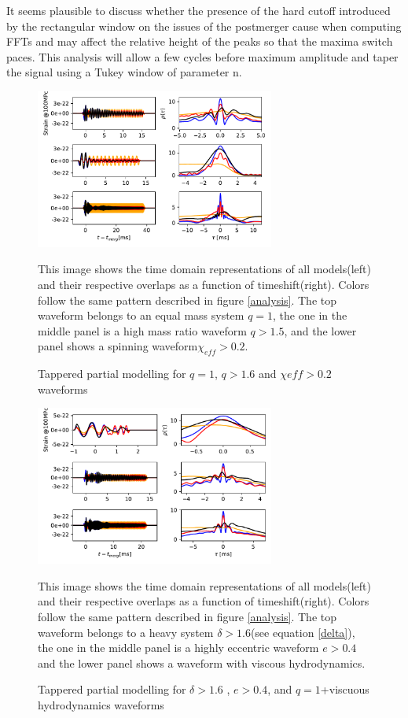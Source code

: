 It seems plausible to discuss whether the presence of the hard cutoff introduced by the rectangular window on the issues of the postmerger cause when computing FFTs and may affect the relative height of the peaks so that the maxima switch paces. This analysis will allow a few cycles before maximum amplitude and taper the signal using a Tukey window of parameter n.

\begin{figure}[hbt!]
\begin{center}
\includegraphics[width=0.7\textwidth, angle=0]{images/Data_analysis/results/phi-A3.pdf}
\caption{Tappered partial modelling for $q=1$, $q>1.6$ and $\chi{eff}>0.2$ waveforms}
\end{center}
This image shows the time domain representations of all models(left) and their respective overlaps as a function of timeshift(right). Colors follow the same pattern described in figure \ref{analysis}. The top waveform belongs to an equal mass system $q=1$, the one in the middle panel is a high mass ratio waveform $q>1.5$, and the lower panel shows a spinning waveform$\chi_{eff}>0.2$.
\end{figure}

\begin{figure}[hbt!]
\begin{center}
\includegraphics[width=0.7\textwidth, angle=0]{images/Data_analysis/results/phi-A4.pdf}
\caption{Tappered partial modelling for $\delta>1.6$ , $e>0.4$, and $q=1$+viscuous hydrodynamics waveforms}
\end{center}
This image shows the time domain representations of all models(left) and their respective overlaps as a function of timeshift(right). Colors follow the same pattern described in figure \ref{analysis}. The top waveform belongs to a heavy system $\delta>1.6$(see equation \ref{delta}), the one in the middle panel is a highly eccentric waveform $e>0.4$ and the lower panel shows a waveform with viscous hydrodynamics.
\end{figure}
\FloatBarrier

